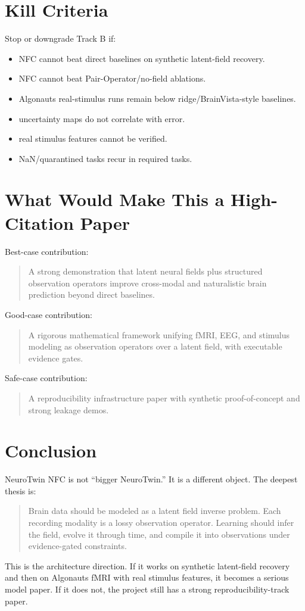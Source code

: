\documentclass[11pt]{article}
\begin{document}
\section{Kill Criteria}

Stop or downgrade Track B if:
\begin{itemize}
\item NFC cannot beat direct baselines on synthetic latent-field recovery.
\item NFC cannot beat Pair-Operator/no-field ablations.
\item Algonauts real-stimulus runs remain below ridge/BrainVista-style baselines.
\item uncertainty maps do not correlate with error.
\item real stimulus features cannot be verified.
\item NaN/quarantined tasks recur in required tasks.
\end{itemize}

\section{What Would Make This a High-Citation Paper}

Best-case contribution:
\begin{quote}
A strong demonstration that latent neural fields plus structured observation operators improve cross-modal and naturalistic brain prediction beyond direct baselines.
\end{quote}
Good-case contribution:
\begin{quote}
A rigorous mathematical framework unifying fMRI, EEG, and stimulus modeling as observation operators over a latent field, with executable evidence gates.
\end{quote}
Safe-case contribution:
\begin{quote}
A reproducibility infrastructure paper with synthetic proof-of-concept and strong leakage demos.
\end{quote}

\section{Conclusion}

NeuroTwin NFC is not ``bigger NeuroTwin.'' It is a different object. The deepest thesis is:
\begin{quote}
Brain data should be modeled as a latent field inverse problem. Each recording modality is a lossy observation operator. Learning should infer the field, evolve it through time, and compile it into observations under evidence-gated constraints.
\end{quote}
This is the architecture direction. If it works on synthetic latent-field recovery and then on Algonauts fMRI with real stimulus features, it becomes a serious model paper. If it does not, the project still has a strong reproducibility-track paper.
\end{document}

